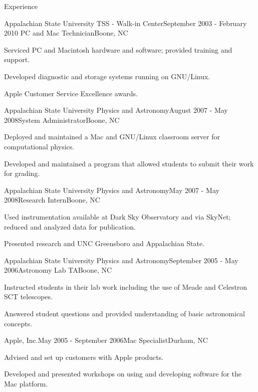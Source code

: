 \documentclass{cv} %
\begin{document}
\begin{rSection}{Experience}
\begin{rSubsection}{Appalachian State University TSS - Walk-in Center}{September 2003 - February 2010
}{PC and Mac Technician}{Boone, NC}
\item Serviced PC and Macintosh hardware and software; provided training and support.
\item Developed diagnostic and storage systems running on GNU/Linux.
\item Apple Customer Service Excellence awards.
\end{rSubsection}

\begin{rSubsection}{Appalachian State University Physics and Astronomy}{August 2007 - May 2008}{System Administrator}{Boone, NC}
\item Deployed and maintained a Mac and GNU/Linux classroom server for computational physics.
\item Developed and maintained a program that allowed students to submit their work for grading.
\end{rSubsection}

\begin{rSubsection}{Appalachian State University Physics and Astronomy}{May 2007 - May 2008}{Research Intern}{Boone, NC}
\item Used instrumentation available at Dark Sky Observatory and via SkyNet; reduced and analyzed data for publication.
\item Presented research and UNC Greensboro and Appalachian State.
\end{rSubsection}

\begin{rSubsection}{Appalachian State University Physics and Astronomy}{September 2005 - May 2006}{Astronomy Lab TA}{Boone, NC}
\item Instructed students in their lab work including the use of Meade and Celestron SCT telescopes.
\item Answered student questions and provided understanding of basic astronomical concepts.
\end{rSubsection}

\begin{rSubsection}{Apple, Inc.}{May 2005 - September 2006}{Mac Specialist}{Durham, NC}
\item Advised and set up customers with Apple products.
\item Developed and presented workshops on using and developing software for the Mac platform.
\end{rSubsection}

\end{rSection}
\end{document}
